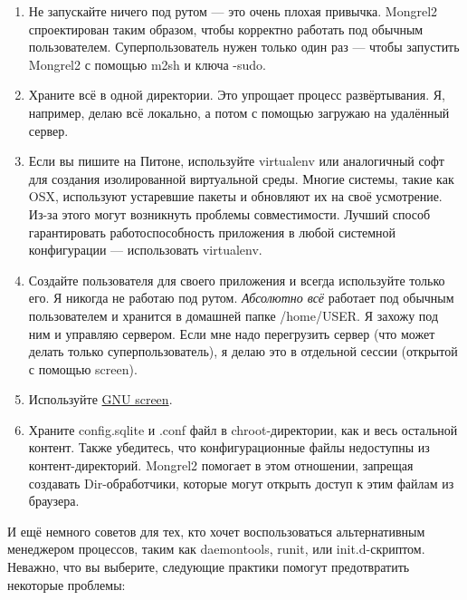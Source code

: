 \begin{enumerate}

\item Не запускайте ничего под рутом --- это очень плохая привычка. Mongrel2
спроектирован таким образом, чтобы корректно работать под обычным пользователем.
Суперпользователь нужен только один раз --- чтобы запустить Mongrel2 с помощью
m2sh и ключа -sudo.

\item Храните всё в одной директории. Это упрощает процесс развёртывания.  Я,
например, делаю всё локально, а потом с помощью  загружаю на
удалённый сервер.

\item Если вы пишите на Питоне, используйте virtualenv или аналогичный софт для
создания изолированной виртуальной среды. Многие системы, такие как OSX,
используют устаревшие пакеты и обновляют их на своё усмотрение. Из-за этого
могут возникнуть проблемы совместимости. Лучший способ гарантировать
работоспособность приложения в любой системной конфигурации --- использовать
virtualenv.

\item Создайте пользователя для своего приложения и всегда используйте только
его. Я никогда не работаю под рутом. \emph{Абсолютно всё} работает под обычным
пользователем и хранится в домашней папке /home/USER. Я захожу под ним и
управляю сервером. Если мне надо перегрузить сервер (что может делать только
суперпользователь), я делаю это в отдельной сессии (открытой с помощью screen).

\item Используйте \href{http://www.gnu.org/software/screen/}{GNU screen}.

\item Храните config.sqlite и .conf файл в chroot-директории, как и весь
остальной контент. Также убедитесь, что конфигурационные файлы недоступны из
контент-директорий. Mongrel2 помогает в этом отношении, запрещая создавать
Dir-обработчики, которые могут открыть доступ к этим файлам из браузера.

\end{enumerate}

И ещё немного советов для тех, кто хочет воспользоваться альтернативным
менеджером процессов, таким как daemontools, runit, или init.d-скриптом.
Неважно, что вы выберите, следующие практики помогут предотвратить некоторые
проблемы:

